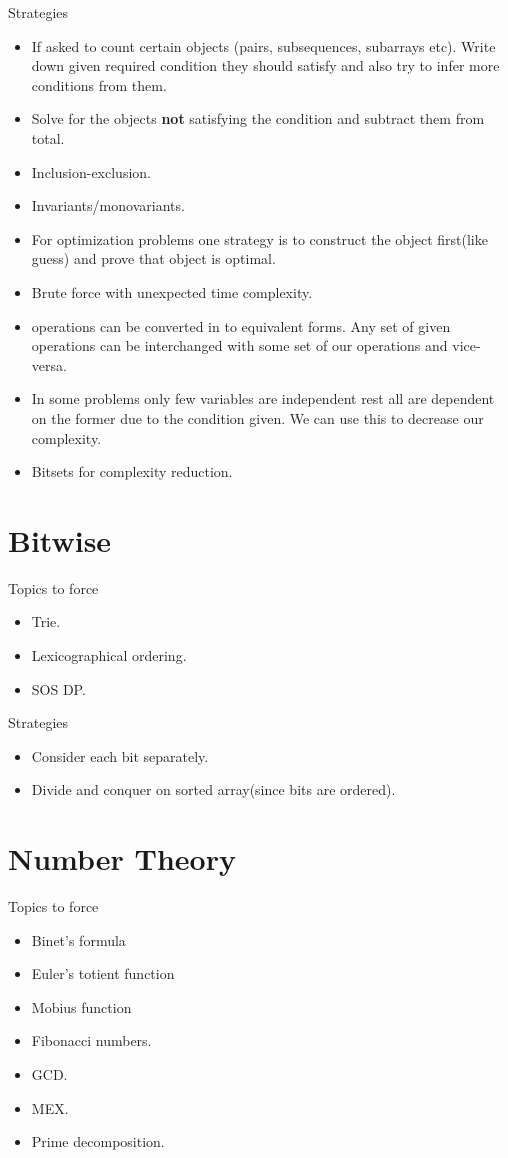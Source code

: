 \documentclass[../Notes.tex]{subfiles}
\begin{document}
Strategies
\begin{itemize}
	\item If asked to count certain objects (pairs, subsequences, subarrays etc). Write down given required condition they should satisfy and also try to infer more conditions from them.
	\item Solve for the objects \textbf{not} satisfying the condition and subtract them from total.
	\item Inclusion-exclusion.
	\item Invariants/monovariants.
	\item For optimization problems one strategy is to construct the object first(like guess) and prove that object is optimal.
	\item Brute force with unexpected time complexity.
	\item operations can be converted in to equivalent forms. Any set of given operations can be interchanged with some set of our operations and vice-versa.
	\item In some problems only few variables are independent rest all are dependent on the former due to the condition given. We can use this to decrease our complexity.
	\item Bitsets for complexity reduction.
\end{itemize}

\section{Bitwise}
Topics to force
\begin{itemize}
	\item Trie.
	\item Lexicographical ordering.
	\item SOS DP.
\end{itemize}

Strategies
\begin{itemize}
	\item Consider each bit separately.
	\item Divide and conquer on sorted array(since bits are ordered).
\end{itemize}
\section{Number Theory}
Topics to force
\begin{itemize}
	\item Binet's formula
	\item Euler's totient function
	\item Mobius function
	\item Fibonacci numbers.
	\item GCD.
	\item MEX.
	\item Prime decomposition.
\end{itemize}
\end{document}
